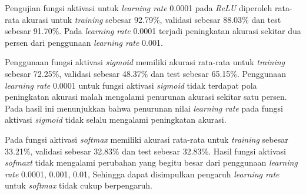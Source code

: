     Pengujian fungsi aktivasi untuk \textit{learning rate} 0.0001 
    pada \textit{ReLU} diperoleh rata-rata akurasi untuk \textit{training} sebesar 92.79\%, validasi sebesar 88.03\% dan test sebesar 91.70\%. Pada \textit{learning rate} 0.0001 terjadi peningkatan akurasi sekitar dua persen dari penggunaan \textit{learning rate} 0.001. 
    
    Penggunaan fungsi aktivasi \textit{sigmoid} memiliki akurasi rata-rata untuk \textit{training} sebesar 72.25\%, validasi sebesar 48.37\% dan test sebesar 65.15\%. Penggunaan \textit{learning rate} 0.0001 untuk fungsi aktivasi \textit{sigmoid} tidak terdapat pola peningkatan akurasi malah mengalami penurunan akurasi sekitar satu persen. Pada hasil ini menunjukkan bahwa penurunan nilai \textit{learning rate} pada fungsi aktivasi \textit{sigmoid}
    tidak selalu mengalami peningkatan akurasi. 

    Pada fungsi aktivasi \textit{softmax} memiliki akurasi rata-rata untuk \textit{training} sebesar 33.21\%, validasi sebesar 32.83\% dan test sebesar 32.83\%. Hasil fungsi aktivasi \textit{sofmaxt} tidak mengalami perubahan yang begitu besar dari penggunaan \textit{learning rate} 0.0001, 0.001, 0.01, Sehingga dapat disimpulkan pengaruh \textit{learning rate} untuk \textit{softmax }tidak cukup berpengaruh.



